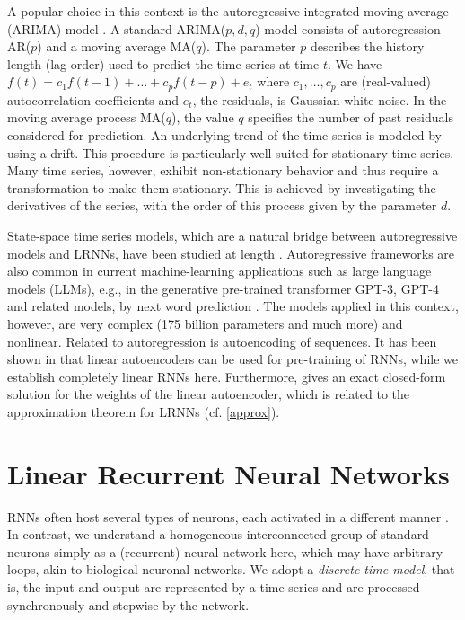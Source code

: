 \documentclass{sn-jnl}
\theoremstyle{definition}
\begin{document}
A popular choice in this context is the autoregressive integrated moving average
(ARIMA) model \citep{HK08,HA13}. A standard ARIMA($p,d,q$) model consists of
autoregression AR($p$) and a moving average MA($q$). The parameter $p$ describes
the history length (lag order) used to predict the time series at time $t$. We
have $f(t) = c_1 f(t-1) + \dots + c_p f(t-p) + e_t$ where $c_1,\dots,c_p$ are
(real-valued) autocorrelation coefficients and $e_t$, the residuals, is
Gaussian white noise. In the moving average process MA($q$), the value $q$
specifies the number of past residuals considered for prediction. An underlying
trend of the time series is modeled by using a drift. This procedure is particularly well-suited for stationary time
series.
Many time series, however, exhibit non-stationary behavior and thus require a
transformation to make them stationary. This is achieved by investigating the
derivatives of the series, with the order of this process given by the parameter
$d$.

State-space time series models, which are a natural bridge between
autoregressive models and LRNNs, have been studied at length \citep{Ham94}.
Autoregressive frameworks are also common in current machine-learning
applications such as large language models (LLMs), e.g., in the generative
pre-trained transformer GPT-3, GPT-4 and related models, by next word prediction
\citep{BM+20,OpenAI24}. The models applied in this context,
however, are very complex (175 billion parameters and much more) and nonlinear.
Related to autoregression is autoencoding of sequences. It has been shown in \citep{PS14}
that linear autoencoders can be used for pre-training of RNNs, while we
establish completely linear RNNs here. Furthermore, \citep{Spe06} gives an
exact closed-form solution for the weights of the linear autoencoder, which is
related to the approximation theorem for LRNNs (cf. \cref{approx}).

\section{Linear Recurrent Neural Networks}\label{define}

RNNs often host several types of neurons, each activated in a different manner
\citep{Elm90,HS97}. In contrast, we understand a homogeneous
interconnected group of standard neurons simply as a (recurrent) neural network here, which may have
arbitrary loops, akin to biological neuronal networks. We adopt a \emph{discrete
time model}, that is, the input and output are represented by a time series and are
processed synchronously and stepwise by the network.
\end{document}
